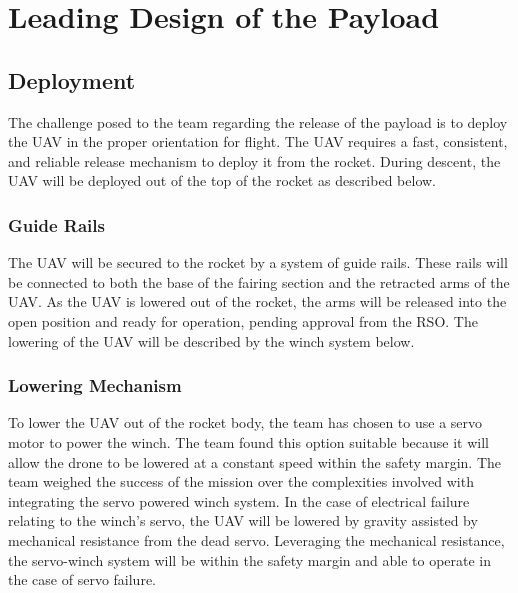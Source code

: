 \chapter{Leading Design of the Payload}

	\section{Deployment}\label{PL:Design:Deployment}
		The challenge posed to the team regarding the release of the payload is to deploy the UAV in the proper orientation for flight. The UAV requires a fast, consistent, and reliable release mechanism to deploy it from the rocket. During descent, the UAV will be deployed out of the top of the rocket as described below. 
		\subsection{Guide Rails}
			The UAV will be secured to the rocket by a system of guide rails. These rails will be connected to both the base of the fairing section and the retracted arms of the UAV. As the UAV is lowered out of the rocket, the arms will be released into the open position and ready for operation, pending approval from the RSO. The lowering of the UAV will be described by the winch system below.  

			\subsection{Lowering Mechanism}
				To lower the UAV out of the rocket body, the team has chosen to use a servo motor to power the winch. The team found this option suitable because it will allow the drone to be lowered at a constant speed within the safety margin. The team weighed the success of the mission over the complexities involved with integrating the servo powered winch system. In the case of electrical failure relating to the winch’s servo, the UAV will be lowered by gravity assisted by mechanical resistance from the dead servo. Leveraging the mechanical resistance, the servo-winch system will be within the safety margin and able to operate in the case of servo failure.

